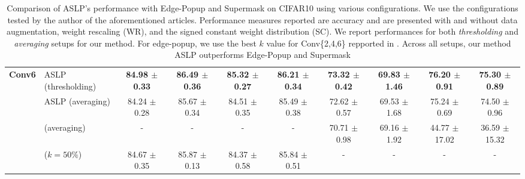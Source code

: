 \begin{table}[htbp]
{\begin{tabular}{llcccccccc}
       \multirow{4}{*}{\textbf{Conv6}} & ASLP (thresholding) & \textbf{84.98 $\pm$ 0.33} & \textbf{86.49 $\pm$ 0.36} & \textbf{85.32 $\pm$ 0.27} & \textbf{86.21 $\pm$ 0.34} & \textbf{73.32 $\pm$ 0.42} & \textbf{69.83 $\pm$ 1.46} & \textbf{76.20 $\pm$ 0.91} & \textbf{75.30 $\pm$ 0.89} \\
        & ASLP (averaging)& 84.24 $\pm$ 0.28 & 85.67 $\pm$ 0.34 & 84.51 $\pm$ 0.35 & 85.49 $\pm$ 0.38 & 72.62 $\pm$ 0.57 & 69.53 $\pm$ 1.68 & 75.24 $\pm$ 0.69 & 74.50 $\pm$ 0.96 \\
        & \cite{DBLP:conf/nips/ZhouLLY19} (averaging) & - & - & - & - & 70.71 $\pm$ 0.98 & 69.16 $\pm$ 1.92 & 44.77 $\pm$ 17.02 & 36.59 $\pm$ 15.32 \\
        & \cite{DBLP:conf/cvpr/RamanujanWKFR20} ($k=50\%$) & 84.67 $\pm$ 0.35 & 85.87 $\pm$ 0.13 & 84.37 $\pm$ 0.58 & 85.84 $\pm$ 0.51 & - & - & - & - \\
      \bottomrule
    \end{tabular}
  }
  \caption{Comparison of ASLP's performance with Edge-Popup and Supermask
  \cite{DBLP:conf/cvpr/RamanujanWKFR20,DBLP:conf/nips/ZhouLLY19} on CIFAR10
  using various configurations. We use the configurations tested by the author
  of the aforementioned articles. Performance measures reported are accuracy and
  are presented with and without data augmentation, weight rescaling (WR), and
  the signed constant weight distribution (SC). We report performances for both
  \textit{thresholding} and \textit{averaging} setups for our method. For edge-popup, we use
  the best $k$ value for Conv\{2,4,6\} repported in
  \cite{DBLP:conf/cvpr/RamanujanWKFR20}.  Across all setups, our method ASLP
  outperforms Edge-Popup and Supermask}
  \label{tab:chap2:con_performances_comparison_cifar10}
  
\end{table}



